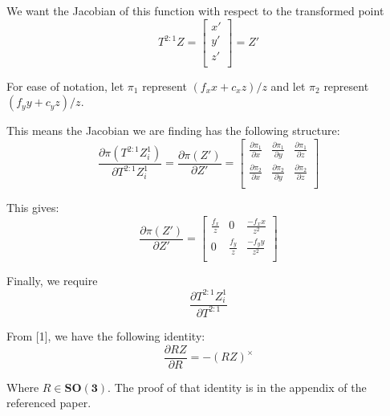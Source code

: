 \documentclass[twoside]{article}
\begin{document}
We want the Jacobian of this function with respect to the transformed point
\begin{equation}
T^{2:1}Z = 
\begin{bmatrix}
x' \\
y' \\
z' \\
\end{bmatrix}
= Z'
\end{equation}

For ease of notation, let $\pi_1$ represent $(f_xx + c_xz)/z$ and let $\pi_2$ represent $(f_yy + c_yz)/z$.

This means the Jacobian we are finding has the following structure:
\begin{equation}
\frac{\partial \pi (T^{2:1} Z_i^1)}{\partial T^{2:1} Z_i^1} = 
\frac{\partial \pi (Z')}{\partial Z'} = 
\begin{bmatrix}
\frac{\partial \pi_1}{\partial x} & \frac{\partial \pi_1}{\partial y} & \frac{\partial \pi_1}{\partial z} \\
\frac{\partial \pi_2}{\partial x} & \frac{\partial \pi_2}{\partial y} & \frac{\partial \pi_2}{\partial z} \\
\end{bmatrix}
\end{equation}

This gives:
\begin{equation}
\frac{\partial \pi (Z')}{\partial Z'} = 
\begin{bmatrix}
\frac{f_x}{z} & 
0 & 
\frac{-f_x x}{z^2} \\

0 & 
\frac{f_y}{z} & 
\frac{-f_y y}{z^2} \\
\end{bmatrix}
\end{equation}

Finally, we require 
\begin{equation}
\frac{\partial T^{2:1} Z_i^1}{\partial T^{2:1}}
\end{equation}

From [1], we have the following identity:
\begin{equation}
\frac{\partial RZ}{\partial R} = - (RZ)^\times
\end{equation}

Where $R \in \mathbf{SO(3)}$. The proof of that identity is in the appendix of the referenced paper.
\end{document}

